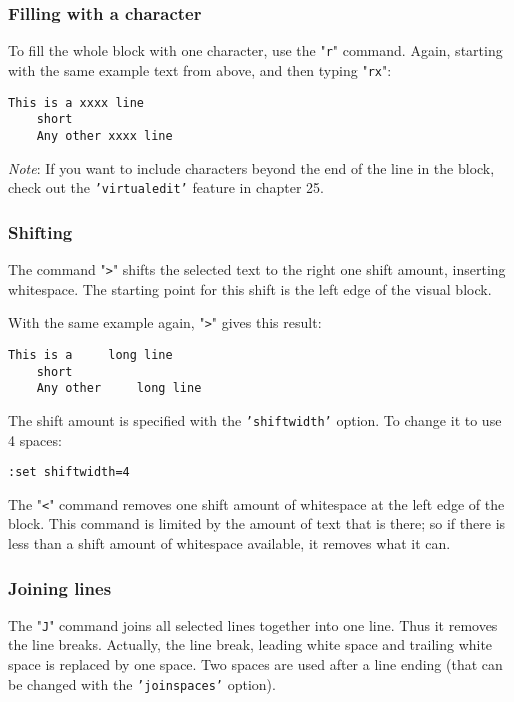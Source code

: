 {{\subsubsection{Filling with a character}
To fill the whole block with one character, use the "\texttt{r}" command.
Again, starting with the same example text from above, and then typing "\texttt{rx}":

\begin{Verbatim}[samepage=true]
    This is a xxxx line 
    short 
    Any other xxxx line 
\end{Verbatim}

\emph{Note}:
If you want to include characters beyond the end of the line in the block, check out the \texttt{'virtualedit'} feature in chapter 25.

\subsubsection{Shifting}
The command "\texttt{>}" shifts the selected text to the right one shift amount, inserting whitespace.
The starting point for this shift is the left edge of the visual block.

With the same example again, "\texttt{>}" gives this result:

\begin{Verbatim}[samepage=true]
    This is a     long line 
    short 
    Any other     long line 
\end{Verbatim}

The shift amount is specified with the \texttt{'shiftwidth'} option.
To change it to use 4 spaces:

\begin{Verbatim}[samepage=true]
 :set shiftwidth=4
\end{Verbatim}

The "\texttt{<}" command removes one shift amount of whitespace at the left edge of the block.
This command is limited by the amount of text that is there; so if there is less than a shift amount of whitespace available, it removes what it can.


\subsubsection{Joining lines}
The "\texttt{J}" command joins all selected lines together into one line.
Thus it removes the line breaks.
Actually, the line break, leading white space and trailing white space is replaced by one space.
Two spaces are used after a line ending (that can be changed with the \texttt{'joinspaces'} option).

}}
